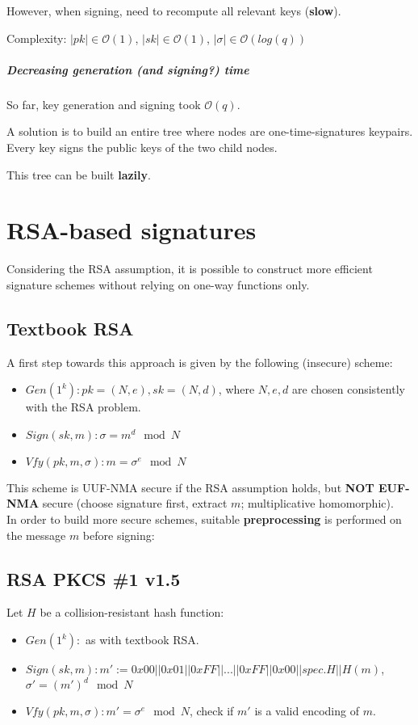 \documentclass[oneside]{book}
\newcommand{\cO}[0]{\mathcal{O}}
\begin{document}
However, when signing, need to recompute all relevant keys (\textbf{slow}).

Complexity: $|pk| \in \cO(1)$, $|sk| \in \cO(1)$, $|\sigma| \in \cO(log(q))$

\paragraph{Decreasing generation (and signing?) time} So far, key generation and signing took $\cO(q)$.

A solution is to build an entire tree where nodes are one-time-signatures keypairs. Every key signs the public keys of the two child nodes.

This tree can be built \textbf{lazily}.

\chapter{RSA-based signatures}
Considering the RSA assumption, it is possible to construct more efficient signature schemes without relying on one-way functions only.

\section{Textbook RSA}
A first step towards this approach is given by the following (insecure) scheme:
\begin{itemize}
    \item $Gen(1^k): pk = (N, e), sk = (N, d)$, where $N, e, d$ are chosen consistently with the RSA problem.
    \item $Sign(sk, m): \sigma = m^d \mod N$
    \item $Vfy(pk, m, \sigma): m = \sigma^e \mod N$
\end{itemize}

This scheme is UUF-NMA secure if the RSA assumption holds, but \textbf{NOT EUF-NMA} secure (choose signature first, extract $m$; multiplicative homomorphic).\\

In order to build more secure schemes, suitable \textbf{preprocessing} is performed on the message $m$ before signing:

\section{RSA PKCS \#1 v1.5}
Let $H$ be a collision-resistant hash function:
\begin{itemize}
    \item $Gen(1^k): $ as with textbook RSA.
    \item $Sign(sk, m): m' := 0x00||0x01||0xFF||...||0xFF||0x00||spec. H||H(m)$, $\sigma' = (m')^d \mod N$
    \item $Vfy(pk, m, \sigma): m' = \sigma^e \mod N$, check if $m'$ is a valid encoding of $m$.
\end{itemize}
\end{document}
